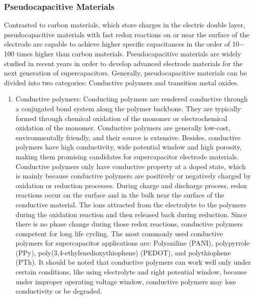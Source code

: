 \documentclass[reprint,amsmath,amssymb,aps,floatfix,
]{revtex4-2}
\begin{document}
\subsubsection{Pseudocapacitive Materials}
Contrasted to carbon materials, which store charges in the electric double layer, pseudocapacitive materials with fast redox reactions on or near the surface of the electrode are capable to achieve higher specific capacitances in the order of 10$-$100 times higher than carbon materials. Pseudocapacitive materials are widely studied in recent years in order to develop advanced electrode materials for the next generation of supercapacitors. Generally, pseudocapacitive materials can be divided into two categories: Conductive polymers and transition metal oxides.
\begin{enumerate}
    \item Conductive polymers: Conducting polymers are rendered conductive through a conjugated bond system along the polymer backbone. They are typically formed through chemical oxidation of the monomer or electrochemical oxidation of the monomer.\cite{Lota2004} Conductive polymers are generally low-cost, environmentally friendly, and their source is extensive. Besides, conductive polymers have high conductivity, wide potential window and high porosity, making them promising candidates for supercapacitor electrode materials. Conductive polymers only have conductive property at a doped state, which is mainly because conductive polymers are positively or negatively charged by oxidation or reduction processes. During charge and discharge process, redox reactions occur on the surface and in the bulk near the surface of the conductive material. The ions attracted from the electrolyte to the polymers during the oxidation reaction and then released back during reduction. Since there is no phase change during those redox reactions, conductive polymers competent for long life cycling. The most commonly used conductive polymers for supercapacitor applications are: Polyaniline (PANI),\cite{Bandeira2020} polypyrrole (PPy),\cite{Wei2012} poly(3,4-ethylenedioxythiophene) (PEDOT),\cite{Keke2008} and polythiophene (PTh).\cite{Laforgue1999} It should be noted that conductive polymers can work well only under certain conditions, like using electrolyte and right potential window, because under improper operating voltage window, conductive polymers may lose conductivity or be degraded.\cite{Zhong2012}

\end{enumerate}
\end{document}

